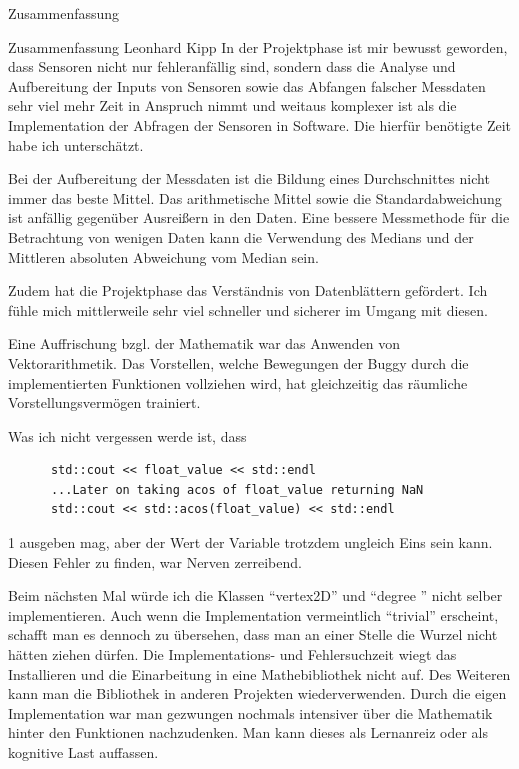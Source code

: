\documentclass[12pt]{report}
\begin{document}
\begin{section}{Zusammenfassung}
  \begin{subsection}{Zusammenfassung Leonhard Kipp}
    In der Projektphase ist mir bewusst geworden, dass Sensoren nicht nur
    fehleranfällig sind, sondern dass die Analyse und Aufbereitung der Inputs
    von Sensoren sowie das Abfangen falscher Messdaten sehr viel mehr Zeit in Anspruch nimmt und weitaus komplexer
    ist als die Implementation der Abfragen der Sensoren in Software. Die
    hierfür benötigte Zeit habe ich unterschätzt.
    
    Bei der Aufbereitung der Messdaten ist die Bildung eines Durchschnittes nicht
    immer das beste Mittel. Das arithmetische Mittel sowie die
    Standardabweichung ist anfällig gegenüber Ausreißern
    in den Daten. Eine bessere Messmethode für die Betrachtung von wenigen Daten
    kann die Verwendung des Medians und der Mittleren absoluten Abweichung vom
    Median sein.

    Zudem hat die Projektphase das Verständnis von Datenblättern gefördert. Ich
    fühle mich mittlerweile sehr viel schneller und sicherer im Umgang mit diesen.

    Eine Auffrischung bzgl. der Mathematik war das Anwenden von Vektorarithmetik. Das Vorstellen,
    welche Bewegungen der Buggy durch die implementierten Funktionen vollziehen
    wird, hat gleichzeitig das räumliche Vorstellungsvermögen trainiert.

    Was ich nicht vergessen werde ist, dass
    \begin{lstlisting}
      std::cout << float_value << std::endl
      ...Later on taking acos of float_value returning NaN
      std::cout << std::acos(float_value) << std::endl
    \end{lstlisting}
    1 ausgeben mag, aber der Wert der Variable trotzdem ungleich Eins sein kann.
    Diesen Fehler zu finden, war Nerven zerreibend.

    Beim nächsten Mal würde ich die Klassen "`vertex2D"' und "`degree "' nicht
    selber implementieren. Auch wenn die Implementation vermeintlich "`trivial"'
    erscheint, schafft man es dennoch zu übersehen, dass man an einer Stelle die
    Wurzel nicht hätten ziehen dürfen. Die Implementations- und Fehlersuchzeit
    wiegt das Installieren und die Einarbeitung in eine Mathebibliothek nicht
    auf. Des Weiteren kann man die Bibliothek in anderen Projekten
    wiederverwenden.
    Durch die eigen Implementation war man gezwungen nochmals
    intensiver über die Mathematik hinter den Funktionen nachzudenken. Man kann
    dieses als Lernanreiz oder als kognitive Last auffassen.


\end{subsection}
\end{section}
\end{document}
